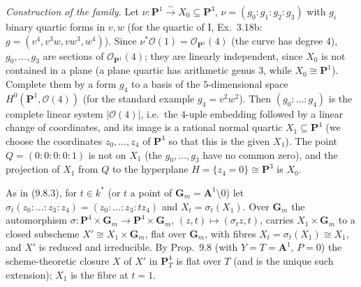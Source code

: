 \documentclass[11pt]{article}
\begin{document}
\emph{Construction of the family.} Let $\nu\colon\mathbf P^1\xrightarrow{\sim}X_0\subseteq\mathbf P^3$, $\nu=(g_0:g_1:g_2:g_3)$ with $g_i$ binary quartic forms in $v,w$ (for the quartic of I, Ex.~3.18b: $g=(v^4,v^3w,vw^3,w^4)$). Since $\nu^*\mathcal O(1)=\mathcal O_{\mathbf P^1}(4)$ (the curve has degree $4$), $g_0,\dots,g_3$ are sections of $\mathcal O_{\mathbf P^1}(4)$; they are linearly independent, since $X_0$ is not contained in a plane (a plane quartic has arithmetic genus $3$, while $X_0\cong\mathbf P^1$). Complete them by a form $g_4$ to a basis of the $5$-dimensional space $H^0(\mathbf P^1,\mathcal O(4))$ (for the standard example $g_4=v^2w^2$). Then $(g_0:\dots:g_4)$ is the complete linear system $|\mathcal O(4)|$, i.e.\ the $4$-uple embedding followed by a linear change of coordinates, and its image is a rational normal quartic $X_1\subseteq\mathbf P^4$ (we choose the coordinates $z_0,\dots,z_4$ of $\mathbf P^4$ so that this is the given $X_1$). The point $Q=(0:0:0:0:1)$ is not on $X_1$ (the $g_0,\dots,g_3$ have no common zero), and the projection of $X_1$ from $Q$ to the hyperplane $H=\{z_4=0\}\cong\mathbf P^3$ is $X_0$.

As in (9.8.3), for $t\in k^*$ (or $t$ a point of $\mathbf G_m=\mathbf A^1\setminus0$) let $\sigma_t(z_0:\dots:z_3:z_4)=(z_0:\dots:z_3:tz_4)$ and $X_t=\sigma_t(X_1)$. Over $\mathbf G_m$ the automorphism $\sigma\colon\mathbf P^4\times\mathbf G_m\to\mathbf P^4\times\mathbf G_m$, $(z,t)\mapsto(\sigma_tz,t)$, carries $X_1\times\mathbf G_m$ to a closed subscheme $X'\cong X_1\times\mathbf G_m$, flat over $\mathbf G_m$, with fibres $X_t=\sigma_t(X_1)\cong X_1$, and $X'$ is reduced and irreducible. By Prop.~9.8 (with $Y=T=\mathbf A^1$, $P=0$) the scheme-theoretic closure $X$ of $X'$ in $\mathbf P^4_T$ is flat over $T$ (and is the unique such extension); $X_1$ is the fibre at $t=1$.
\end{document}
